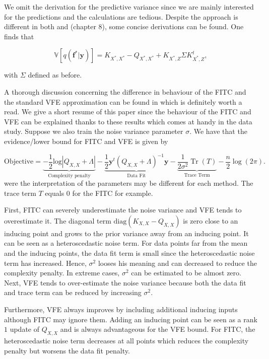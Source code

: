 \documentclass[12pt,a4paper,oneside]{book}
\DeclareMathOperator{\Tr}{Tr}
\begin{document}
We omit the derivation for the predictive variance since we are mainly interested for the predictions and the calculations are tedious. Despite the approach is different in both \cite{titsias2009variational} and \cite{GPRbook} (chapter $8$), some concise derivations can be found. One finds that 

\begin{equation}
\mathbb{V} [q(\bm{f}^{\ast}|\bm{y})] =  K_{X^{\ast},X^{\ast}} - Q_{X^{\ast},X^{\ast}} + K_{X^{\ast},Z} \Sigma K_{X^{\ast},Z}^t,
\end{equation}

with $\Sigma$ defined as before. 

A thorough discussion concerning the difference in behaviour of the FITC and the standard VFE approximation can be found in \cite{bauer2016understanding} which is definitely worth a read. We give a short resume of this paper since the behaviour of the FITC and VFE can be explained thanks to these results which comes at handy in the data study. Suppose we also train the noise variance parameter $\sigma$. We have that the evidence/lower bound for FITC and VFE is given by

\begin{equation}\label{log_marg_ind_input}
\text{Objective} = \underbrace{-\dfrac{1}{2} \text{log}|Q_{X,X}+\Lambda|}_{\text{Complexity penalty}} - \underbrace{\dfrac{1}{2} \bm{y}^t (Q_{X,X} + \Lambda)^{-1} \bm{y}}_{\text{Data Fit}} - \underbrace{\dfrac{1}{2 \sigma^2} \Tr (T)}_{\text{Trace Term}} - \dfrac{n}{2} \log{(2\pi)} .
\end{equation}
were the interpretation of the parameters may be different for each method. The trace term $T$ equals $0$ for the FITC for example.

First, FITC can severely underestimate the noise variance and VFE tends to overestimate it. The diagonal term $\text{diag}( K_{X,X} - Q_{X,X})$ is zero close to an inducing point and grows to the prior variance away from an inducing point. It can be seen as a heteroscedastic noise term. For data points far from the mean and the inducing points, the data fit term is small since the heteroscedastic noise term has increased. Hence, $\sigma^2$ looses his meaning and can decreased to reduce the complexity penalty. In extreme cases, $\sigma^2$ can be estimated to be almost zero. Next, VFE tends to over-estimate the noise variance because both the data fit and trace term can be reduced by increasing $\sigma^2$.

Furthermore, VFE always improves by including additional inducing inputs although FITC may ignore them. Adding an inducing point can be seen as a rank $1$ update of $Q_{X,X}$ and is always advantageous for the VFE bound. For FITC, the heteroscedastic noise term decreases at all points which reduces the complexity penalty but worsens the data fit penalty.
\end{document}
